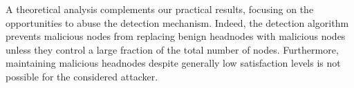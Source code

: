 A theoretical analysis complements our practical results, focusing on the opportunities to abuse the detection mechanism. 
Indeed, the detection algorithm prevents malicious nodes from replacing benign headnodes with malicious nodes unless they control a large fraction of the total number of nodes. 
Furthermore, maintaining malicious headnodes despite generally low satisfaction levels is not possible for the considered attacker. 
  
% 
